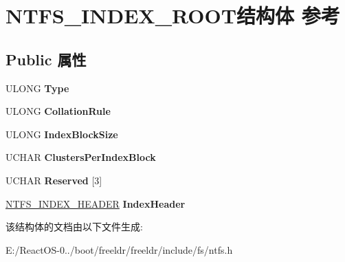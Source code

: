\hypertarget{struct_n_t_f_s___i_n_d_e_x___r_o_o_t}{}\section{N\+T\+F\+S\+\_\+\+I\+N\+D\+E\+X\+\_\+\+R\+O\+O\+T结构体 参考}
\label{struct_n_t_f_s___i_n_d_e_x___r_o_o_t}
\subsection*{Public 属性}
\begin{DoxyCompactItemize}
\item 
\mbox{\label{struct_n_t_f_s___i_n_d_e_x___r_o_o_t_a99704661a746b1b32bf5c13cd75a614f}} 
U\+L\+O\+NG {\bfseries Type}
\item 
\mbox{\label{struct_n_t_f_s___i_n_d_e_x___r_o_o_t_aa2dbaffda8aa73e7da27b1aabad72140}} 
U\+L\+O\+NG {\bfseries Collation\+Rule}
\item 
\mbox{\label{struct_n_t_f_s___i_n_d_e_x___r_o_o_t_a97e580b78c2d68dfd85cbf9e7f6d063b}} 
U\+L\+O\+NG {\bfseries Index\+Block\+Size}
\item 
\mbox{\label{struct_n_t_f_s___i_n_d_e_x___r_o_o_t_a9d857a4df679bf7d74e5b29faea2cf42}} 
U\+C\+H\+AR {\bfseries Clusters\+Per\+Index\+Block}
\item 
\mbox{\label{struct_n_t_f_s___i_n_d_e_x___r_o_o_t_ac3f872040745d316f52838ee258235d1}} 
U\+C\+H\+AR {\bfseries Reserved} \mbox{[}3\mbox{]}
\item 
\mbox{\label{struct_n_t_f_s___i_n_d_e_x___r_o_o_t_a55b85f69b50eda7f069ff2b17aa91797}} 
\hyperlink{struct_n_t_f_s___i_n_d_e_x___h_e_a_d_e_r}{N\+T\+F\+S\+\_\+\+I\+N\+D\+E\+X\+\_\+\+H\+E\+A\+D\+ER} {\bfseries Index\+Header}
\end{DoxyCompactItemize}


该结构体的文档由以下文件生成\+:\begin{DoxyCompactItemize}
\item 
E\+:/\+React\+O\+S-\/0../boot/freeldr/freeldr/include/fs/ntfs.\+h\end{DoxyCompactItemize}
